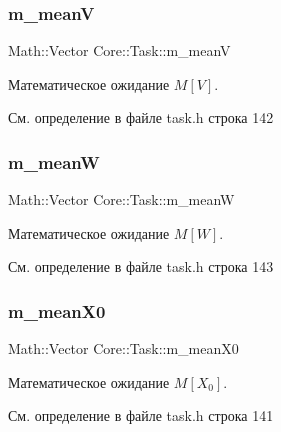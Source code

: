 \hypertarget{class_core_1_1_task_a420e36c620e30cd0f55689ce481c1391}{}\label{class_core_1_1_task_a420e36c620e30cd0f55689ce481c1391} 
\subsubsection{\texorpdfstring{m\+\_\+meanV}{m\_meanV}}
{\footnotesize\ttfamily Math\+::\+Vector Core\+::\+Task\+::m\+\_\+meanV\hspace{0.3cm}{\ttfamily [protected]}}

Математическое ожидание $M[V]$. 

См. определение в файле task.\+h строка 142

\hypertarget{class_core_1_1_task_a3391c29d286ebfae9e77cce5723f2e8c}{}\label{class_core_1_1_task_a3391c29d286ebfae9e77cce5723f2e8c} 
\subsubsection{\texorpdfstring{m\+\_\+meanW}{m\_meanW}}
{\footnotesize\ttfamily Math\+::\+Vector Core\+::\+Task\+::m\+\_\+meanW\hspace{0.3cm}{\ttfamily [protected]}}

Математическое ожидание $M[W]$. 

См. определение в файле task.\+h строка 143

\hypertarget{class_core_1_1_task_a4482edff14b2fca2313e164614bb9693}{}\label{class_core_1_1_task_a4482edff14b2fca2313e164614bb9693} 
\subsubsection{\texorpdfstring{m\+\_\+mean\+X0}{m\_meanX0}}
{\footnotesize\ttfamily Math\+::\+Vector Core\+::\+Task\+::m\+\_\+mean\+X0\hspace{0.3cm}{\ttfamily [protected]}}

Математическое ожидание $M[X_0]$. 

См. определение в файле task.\+h строка 141

\hypertarget{class_core_1_1_task_a02b059438d2e6adf4a2dc8add17b2d3f}{}\label{class_core_1_1_task_a02b059438d2e6adf4a2dc8add17b2d3f} 
